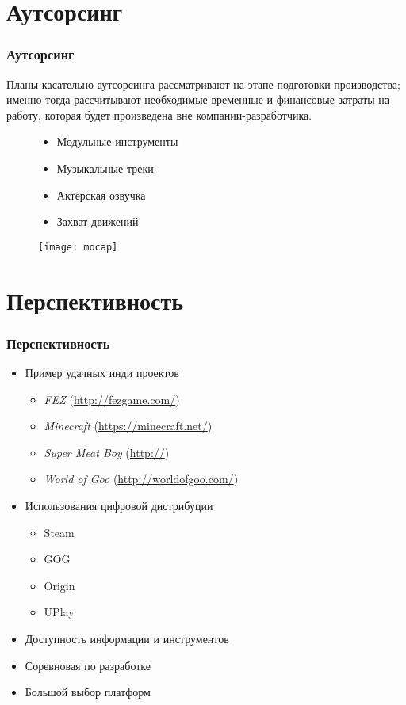 \section{Аутсорсинг}
\begin{frame}
    \frametitle{Аутсорсинг}
    Планы касательно аутсорсинга рассматривают на этапе подготовки производства; именно тогда 
    рассчитывают необходимые временные и финансовые затраты на работу, которая будет произведена вне 
    компании-разработчика.
    \begin{figure}
        \begin{minipage}{0.47\textwidth}
            \begin{itemize}
                \item Модульные инструменты
                \item Музыкальные треки
                \item Актёрская озвучка
                \item Захват движений
            \end{itemize}
        \end{minipage}
        \begin{minipage}{0.5\textwidth}
            \texttt{[image: mocap]}
        \end{minipage}
    \end{figure}
\end{frame}

\section{Перспективность}
\begin{frame}
    \frametitle{Перспективность}
    \begin{itemize}
        \item Пример удачных инди проектов
        \begin{itemize}
            \item \emph{FEZ} (\url{http://fezgame.com/})
            \item \emph{Minecraft} (\url{https://minecraft.net/})
            \item \emph{Super Meat Boy} (\url{http://})
            \item \emph{World of Goo} (\url{http://worldofgoo.com/})
        \end{itemize}
        \item Использования цифровой дистрибуции
        \begin{itemize}
            \item Steam
            \item GOG
            \item Origin
            \item UPlay
        \end{itemize}
        \item Доступность информации и инструментов
        \item Соревновая по разработке
        \item Большой выбор платформ
    \end{itemize}
\end{frame}

